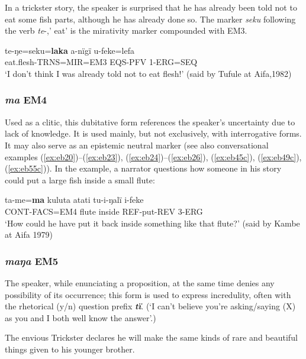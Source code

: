 \documentclass[output=paper]{langsci/langscibook}
\begin{document}
In a trickster story,  the speaker is surprised that he has already been told not to eat some fish parts, although he has already done so. The marker \textit{seku} following the verb \textit{te}-,’ eat’ is the mirativity marker compounded with EM3.  

\begin{exe}
	\ex \label{ex:eb6}
	\gll te-ŋe=seku=\textbf{laka} a-nïgï u-feke=lefa\\
	  eat.flesh-TRNS=MIR=EM3 EQS-PFV 1-ERG=SEQ\\
	\trans ‘I don’t think I was already told not to eat flesh!’ (said by Tufule at Aifa,1982)
\end{exe}

\subsubsection{\textit{ma} EM4}
Used as a clitic, this dubitative form references the speaker’s uncertainty due to lack of knowledge.  It is used mainly, but not exclusively, with interrogative forms. It may also serve as an epistemic neutral marker (see also conversational examples (\ref{ex:eb20})--(\ref{ex:eb23}), (\ref{ex:eb24})--(\ref{ex:eb26}), (\ref{ex:eb45c}), (\ref{ex:eb49c}), (\ref{ex:eb55c})). In the example, a narrator questions how someone in his story could put a large fish inside a small flute:

\begin{exe}
	\ex \label{ex:eb7}
	\gll ta-me=\textbf{ma} kuluta atati tu-i-ŋalï i-feke\\
	CONT-FACS=EM4 flute inside REF-put-REV 3-ERG\\
	\trans ‘How could he have put it back inside something like that flute?’ (said by Kambe at Aifa 1979)
\end{exe}

\subsubsection{\textit{maŋa} EM5} 
The speaker, while enunciating a proposition, at the same time denies any possibility of its occurrence; this form is used to express incredulity, often with the rhetorical (y/n) question prefix \textbf{\textit{tï}}. (‘I can’t believe you’re asking/saying (X) as you and I both well know the answer’.)

The envious Trickster declares he will make the same kinds of rare and beautiful things given to his younger brother.
\end{document}
